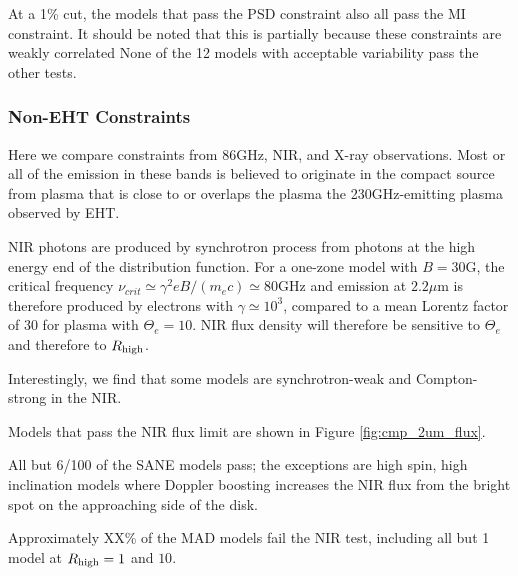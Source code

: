 At a 1\% cut, the models that pass the PSD constraint also all pass the MI constraint. It should be noted that this is partially because these constraints are weakly correlated  None of the 12 models with acceptable variability pass the other tests.

\subsubsection{Non-EHT Constraints}

Here we compare constraints from 86GHz, NIR, and X-ray observations.  Most or all of the emission in these bands is believed to originate in the compact source from plasma that is close to or overlaps the plasma the 230GHz-emitting plasma observed by EHT.



NIR photons are produced by synchrotron process from photons at the high energy end of the distribution function.  For a one-zone model with $B = 30$G, the  critical frequency $\nu_{crit} \simeq \gamma^2 e B/(m_e c) \simeq 80$GHz and emission at $2.2\mu$m is therefore produced by electrons with $\gamma \simeq 10^3$, compared to a mean Lorentz factor of $30$ for plasma with $\Theta_e = 10$.  NIR flux density will therefore be sensitive to $\Theta_e$ and therefore to $R_\mathrm{high}$.

Interestingly, we find that some models are synchrotron-weak and Compton-strong in the NIR.  

Models that pass the NIR flux limit are shown in Figure \ref{fig:cmp_2um_flux}.

All but 6/100 of the SANE models pass; the exceptions are high spin, high inclination models where Doppler boosting increases the NIR flux from the bright spot on the approaching side of the disk.

Approximately XX\% of the MAD models fail the NIR test, including all but 1 model at $R_\mathrm{high} = 1$ and $10$.

